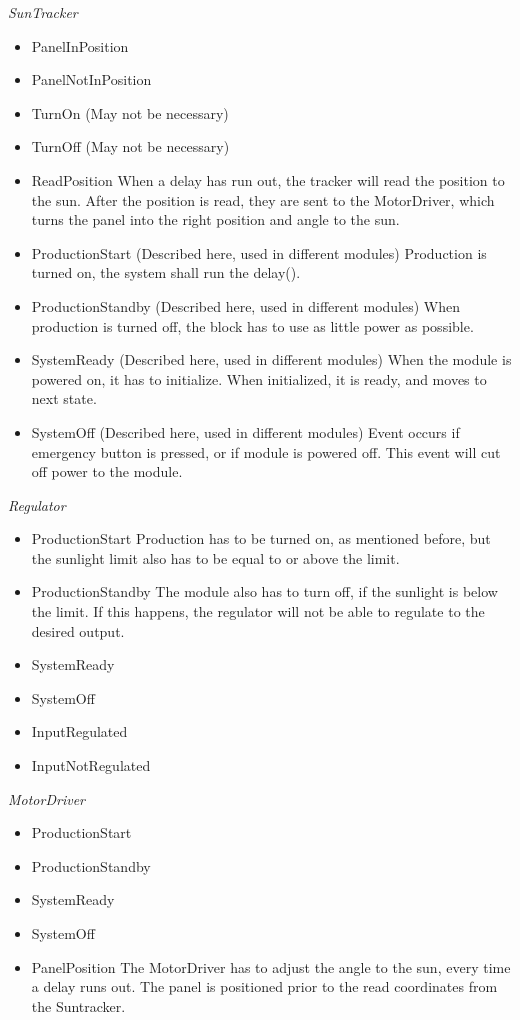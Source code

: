 \documentclass[12pt,a4paper]{report}
\begin{document}
\textit{SunTracker}
\begin{itemize}
\item PanelInPosition
\item PanelNotInPosition
\item TurnOn (May not be necessary)
\item TurnOff (May not be necessary)
\item ReadPosition
\subitem When a delay has run out, the tracker will read the position to the sun. After the position is read, they are sent to the MotorDriver, which turns the panel into the right position and angle to the sun.
\item ProductionStart (Described here, used in different modules)
\subitem Production is turned on, the system shall run the delay().
\item ProductionStandby (Described here, used in different modules)
\subitem When production is turned off, the block has to use as little power as possible.
\item SystemReady (Described here, used in different modules)
\subitem When the module is powered on, it has to initialize. When initialized, it is ready, and moves to next state.
\item SystemOff (Described here, used in different modules)
\subitem Event occurs if emergency button is pressed, or if module is powered off. This event will cut off power to the module.
\end{itemize}



\textit{Regulator}
\begin{itemize}
\item ProductionStart
\subitem Production has to be turned on, as mentioned before, but the sunlight limit also has to be equal to or above the limit.
\item ProductionStandby
\subitem The module also has to turn off, if the sunlight is below the limit. If this happens, the regulator will not be able to regulate to the desired output. 
\item SystemReady
\item SystemOff
\item InputRegulated
\item InputNotRegulated
\end{itemize}


\textit{MotorDriver}
\begin{itemize}
\item ProductionStart
\item ProductionStandby
\item SystemReady
\item SystemOff
\item PanelPosition
\subitem The MotorDriver has to adjust the angle to the sun, every time a delay runs out. The panel is positioned prior to the read coordinates from the Suntracker.
\end{itemize}
\end{document}
